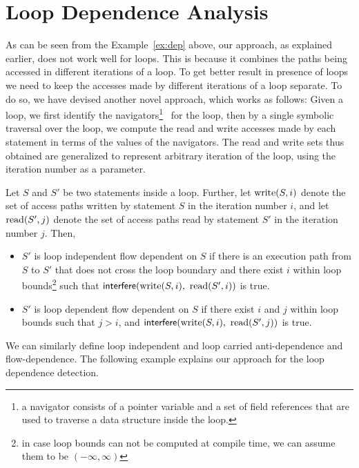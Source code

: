 \documentclass{IOS-Book-Article}
\newcommand{\interf}[2]{\mbox{\sf interfere}(#1,\ #2)}
\begin{document}
\section{Loop Dependence Analysis}
As can be seen from the Example~\ref{ex:dep} above, our
approach, as explained earlier, does not work well for
loops. This is because it combines the paths being accessed
in different iterations of a loop. To get better result in
presence of loops we need to keep the accesses made by
different iterations of a loop separate. To do so, we have
devised another novel approach, which works as follows: Given
a loop, we first identify the navigators\footnote{a navigator
  consists of a pointer variable and a set of field
  references that are used to traverse a data structure
  inside the loop.}~\cite{ghiya98detecting} for the loop,
then by a single symbolic traversal over the loop, we compute
the read and write accesses made by each statement in terms
of the values of the navigators. The read and write sets thus
obtained are generalized to represent arbitrary iteration of
the loop, using the iteration number as a parameter. 

Let $S$ and $S'$ be two statements inside a loop. Further,
let $\mbox{write}(S, i)$ denote the set of access paths written by
statement $S$ in the iteration number $i$, and let
$\mbox{read}(S', j)$ denote the set of access paths read by
statement $S'$ in the iteration number $j$. Then, 
\begin{itemize}
\item $S'$ is loop independent flow dependent on $S$ if there
  is an execution path from $S$ to $S'$ that does not cross
  the loop boundary and there exist $i$ within loop
  bounds\footnote{in case loop bounds can not be computed at
    compile time, we can assume them to be $(-\infty,
    \infty)$} such that $\interf{\wst{S}{i}}{\rst{S'}{i}}$ is
  true.
\item $S'$ is loop dependent flow dependent on $S$ if there
  exist $i$ and $j$ within loop bounds such that $j > i$, and
  $\interf{\wst{S}{i}}{\rst{S'}{j}}$ is true.
\end{itemize}

We can similarly define loop independent and loop carried
anti-dependence and flow-dependence. The following example
explains our approach for the loop dependence detection.
\end{document}
